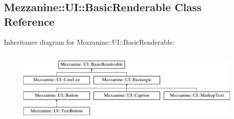 \hypertarget{classMezzanine_1_1UI_1_1BasicRenderable}{
\subsection{Mezzanine::UI::BasicRenderable Class Reference}
\label{classMezzanine_1_1UI_1_1BasicRenderable}
}
Inheritance diagram for Mezzanine::UI::BasicRenderable:\begin{figure}[H]
\begin{center}
\leavevmode
\includegraphics[height=3.733333cm]{classMezzanine_1_1UI_1_1BasicRenderable}
\end{center}
\end{figure}
